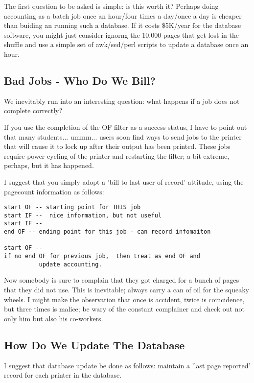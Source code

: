 \documentclass[a4paper]{article}
\begin{document}
The first question to be asked is simple:  is this worth it?
Perhaps doing accounting as a batch job once an hour/four times
a day/once a day is cheaper than buiding an running such a database.
If it costs \$5K/year for the database software, you might just consider
ignorng the 10,000 pages that get lost in the shuffle and use
a simple set of awk/sed/perl scripts to update a database once
an hour.


\subsection{Bad Jobs - Who Do We Bill?}

We inevitably run into an interesting question:
what happens if a job does not complete correctly?

If you use the completion of the OF filter as a success status, I have
to point out that many students... ummm... users soon find ways to send
jobs to the printer that will cause it to lock up after their output
has been printed. These jobs require power cycling of the printer and
restarting the filter; a bit extreme, perhaps, but it has happened.

I suggest that you simply adopt a 'bill to last user of record'
attitude,  using the pagecount information as follows:
\begin{tscreen}
\begin{verbatim}
start OF -- starting point for THIS job
start IF --  nice information, but not useful
start IF --
end OF -- ending point for this job - can record infomaiton

start OF --
if no end OF for previous job,  then treat as end OF and
          update accounting.
\end{verbatim}
\end{tscreen}


Now somebody is sure to complain that they got charged for a bunch of
pages that they did not use.  This is inevitable;  always carry a
can of oil for the squeaky wheels.  I might make the observation that
once is accident, twice is coincidence, but three times is malice;
be wary of the constant complainer and check out not only him but
also his co-workers.


\subsection{How Do We Update The Database}

I suggest that database update be done as follows:
maintain a 'last page reported' record for each printer in the
database.
\end{document}

